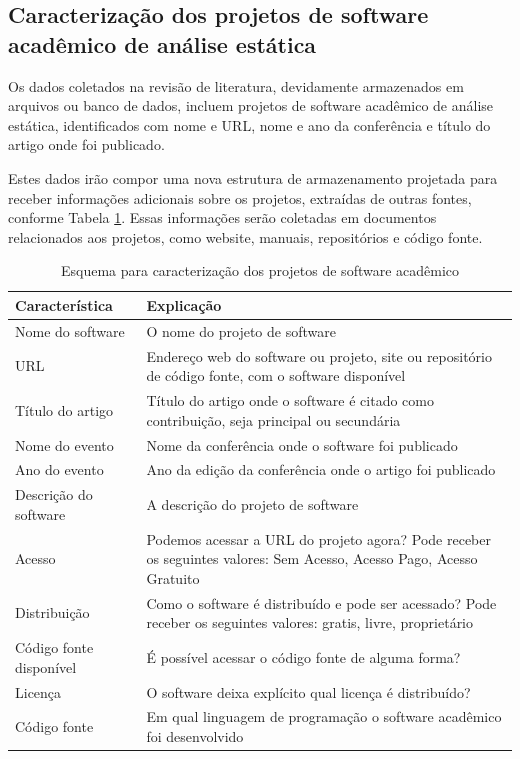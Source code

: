 \subsection{Caracterização dos projetos de software acadêmico de análise estática}

Os dados coletados na revisão de literatura, devidamente armazenados em
arquivos ou banco de dados, incluem projetos de software acadêmico de análise
estática, identificados com nome e URL, nome e ano da conferência e
título do artigo onde foi publicado.

Estes dados irão compor uma nova estrutura de armazenamento
projetada para receber informações adicionais sobre os projetos, 
extraídas de outras fontes, conforme Tabela
\ref{esquema-caracteristicas}. Essas informações serão coletadas em documentos
relacionados aos projetos, como website, manuais, repositórios e código fonte.

\begin{table}[h]
\caption{Esquema para caracterização dos projetos de software acadêmico}
\centering
\begin{tabular}{ l p{11cm} }
  \hline
  Característica           & Explicação \\
  \hline
  Nome do software         & O nome do projeto de software \\
  URL                      & Endereço web do software ou projeto, site ou repositório de código fonte, com o software disponível \\
  Título do artigo         & Título do artigo onde o software é citado como contribuição, seja principal ou secundária \\
  Nome do evento           & Nome da conferência onde o software foi publicado \\
  Ano do evento            & Ano da edição da conferência onde o artigo foi publicado \\
  Descrição do software    & A descrição do projeto de software \\
  Acesso                   & Podemos acessar a URL do projeto agora? Pode receber os seguintes valores: Sem Acesso, Acesso Pago, Acesso Gratuito \\
  Distribuição             & Como o software é distribuído e pode ser acessado? Pode receber os seguintes valores: gratis, livre, proprietário \\
  Código fonte disponível  & É possível acessar o código fonte de alguma forma? \\
  Licença                  & O software deixa explícito qual licença é distribuído? \\
  Código fonte             & Em qual linguagem de programação o software acadêmico foi desenvolvido \\
  \hline
\end{tabular}
\label{esquema-caracteristicas}
\end{table}

